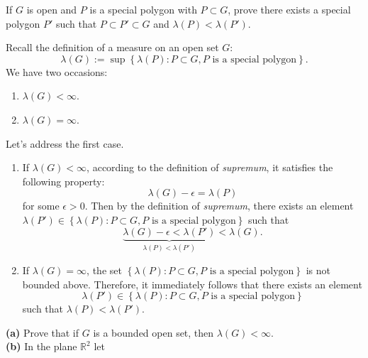 \documentclass[answers]{exam}
\begin{document}
\newpage
{}
\begin{questions}
   \question
   If $G$ is open and $P$ is a special polygon with $P \subset G$, prove there exists a special polygon $P'$ such that $P \subset P' \subset G$ and $\lambda\left(P\right) <\lambda\left(P'\right)$.
   \begin{solution}
      Recall the definition of a measure on an open set $G$:
      $$
         \lambda\left(G\right) := \sup \left\{\lambda\left(P\right): P \subset G, P \text{ is a special polygon} \right\}.
      $$
      We have two occasions: 
      \begin{enumerate}
      \item $\lambda\left(G\right) < \infty$.
      \item $\lambda\left(G\right) = \infty$. \end{enumerate}
      Let's address the first case.
      \begin{enumerate}
         \item If $\lambda\left(G\right) < \infty$, according to the definition of \emph{supremum}, it satisfies the following property:
         $$
            \lambda\left(G\right) - \epsilon = \lambda\left(P\right)
         $$
         for some $\epsilon > 0$. Then by the definition of \emph{supremum}, there exists an element $\lambda\left(P'\right) \in \left\{\lambda\left(P\right): P \subset G, P \text{ is a special polygon} \right\}$ such that
         $$
            \underbrace{\lambda\left(G\right) - \epsilon < \lambda\left(P'\right)}_{\lambda\left(P\right) < \lambda\left(P'\right)} < \lambda\left(G\right).
         $$
         \item If $\lambda\left(G\right) = \infty$, the set $\left\{\lambda\left(P\right): P \subset G, P\text{ is a special polygon} \right\}$ is not bounded above. Therefore, it immediately follows that there exists an element $$\lambda\left(P'\right) \in \left\{\lambda\left(P\right): P \subset G, P\text{ is a special polygon} \right\}$$ such that $\lambda\left(P\right) < \lambda\left(P'\right)$.
      \end{enumerate}
   \end{solution}
   \question
   \textbf{(a)} Prove that if $G$ is a bounded open set, then $\lambda\left(G\right)<\infty$.\\
   \textbf{(b)} In the plane $\mathbb{R}^{2}$ let
   $$
$$
\end{questions}
\end{document}
